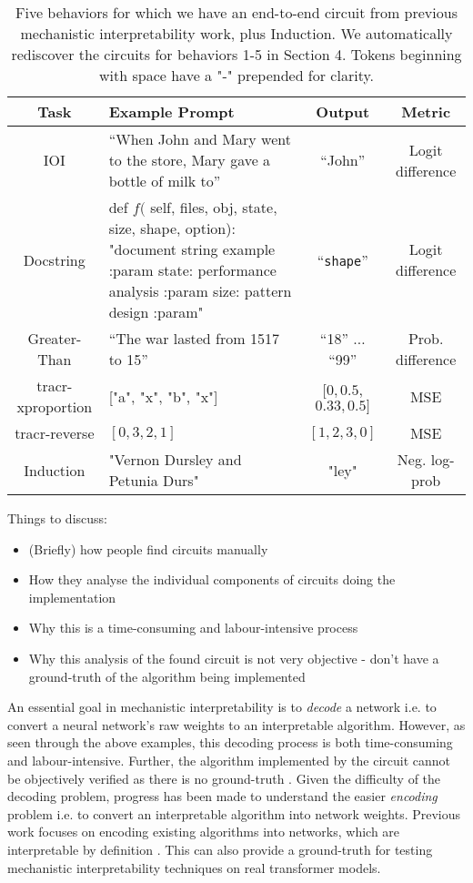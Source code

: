 \documentclass[11pt]{scrartcl}
\begin{document}
\begin{table}[htbp] %
\centering %
\begin{tabular}{|c|p{}|c|c|}
\hline
\textbf{Task} & \textbf{Example Prompt} & \textbf{Output} & \textbf{Metric} \\ \hline
IOI & ``When John and Mary went to the store, Mary gave a bottle of milk to'' & ``John'' & Logit difference \\ \hline
Docstring & def $f($ self, files, obj, state, size, shape, option): "document string example :param state: performance analysis :param size: pattern design :param" & ``\texttt{shape}'' & Logit difference \\ \hline
Greater-Than & ``The war lasted from 1517 to 15'' & ``18'' $\ldots$ ``99'' & Prob. difference \\ \hline
tracr-xproportion & ["a", "x", "b", "x"] & {$[0,0.5$, $0.33,0.5]$} & MSE \\ \hline
tracr-reverse & {$[0,3,2,1]$} & {$[1,2,3,0]$} & MSE \\ \hline
Induction & "Vernon Dursley and Petunia Durs" & "ley" & Neg. log-prob \\ \hline
\end{tabular}
\caption{Five behaviors for which we have an end-to-end circuit from previous mechanistic interpretability work, plus Induction. We automatically rediscover the circuits for behaviors 1-5 in Section 4. Tokens beginning with space have a "-" prepended for clarity.}
\label{tab:behaviors} %
\end{table}


\color{blue}
Things to discuss:
\begin{itemize}
\item (Briefly) how people find circuits manually
\item How they analyse the individual components of circuits doing the implementation
\item Why this is a time-consuming and labour-intensive process
\item Why this analysis of the found circuit is not very objective - don't have a ground-truth of the algorithm being implemented
\end{itemize}
\color{black}


An essential goal in mechanistic interpretability is to \textit{decode} a network i.e. to convert a neural network's raw weights to an interpretable algorithm. However, as seen through the above examples, this decoding process is both time-consuming and labour-intensive. Further, the algorithm implemented by the circuit cannot be objectively verified as there is no ground-truth \cite{yang2019evaluating}. Given the difficulty of the decoding problem, progress has been made to understand the easier \textit{encoding} problem i.e. to convert an interpretable algorithm into network weights. Previous work focuses on encoding existing algorithms into networks, which are interpretable by definition \cite{lindner2024tracr, weiss2021thinking}. This can also provide a ground-truth for testing mechanistic interpretability techniques on real transformer models. 
\end{document}
